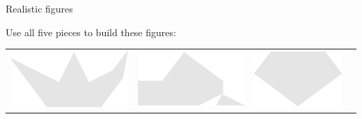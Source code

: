 \documentclass[14pt]{beamer}
\begin{document}
    \begin{frame}{Realistic figures}
        \vspace{-1em}
        \begin{center}
            Use all five pieces to build these figures:

            \bigskip
        
            {\footnotesize
            \begin{tabular}{cccc}
                \includegraphics[scale=0.25]{figures/figure026a.pdf}\;\; &
                \includegraphics[scale=0.25]{figures/figure026b.pdf} &
                \includegraphics[scale=0.25]{figures/figure026f.pdf} &

\end{tabular}}
\end{center}
\end{frame}
\end{document}
